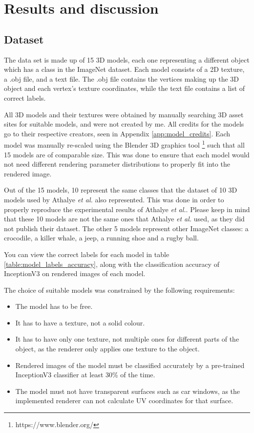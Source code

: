 \chapter{Results and discussion}
    \label{chap:results}

\section{Dataset}
    \label{sec:dataset}
    
The data set is made up of 15 3D models, each one representing a different object which has a class in the ImageNet dataset. Each model consists of a 2D texture, a .obj file, and a text file. The .obj file contains the vertices making up the 3D object and each vertex's texture coordinates, while the text file contains a list of correct labels.

All 3D models and their textures were obtained by manually searching 3D asset sites for suitable models, and were not created by me. All credits for the models go to their respective creators, seen in Appendix \ref{app:model_credits}. Each model was manually re-scaled using the Blender 3D graphics tool \footnote{https://www.blender.org/} such that all 15 models are of comparable size. This was done to ensure that each model would not need different rendering parameter distributions to properly fit into the rendered image.

Out of the 15 models, 10 represent the same classes that the dataset of 10 3D models used by Athalye \textit{et al.} \cite{athalye} also represented. This was done in order to properly reproduce the experimental results of Athalye \textit{et al.}. Please keep in mind that these 10 models are not the same ones that Athalye \textit{et al.} used, as they did not publish their dataset. The other 5 models represent other ImageNet classes: a crocodile, a killer whale, a jeep, a running shoe and a rugby ball.

You can view the correct labels for each model in table \ref{table:model_labels_accuracy}, along with the classification accuracy of InceptionV3 on rendered images of each model.

The choice of suitable models was constrained by the following requirements:

\begin{itemize}
    \item The model has to be free.
    \item It has to have a texture, not a solid colour.
    \item It has to have only one texture, not multiple ones for different parts of the object, as the renderer only applies one texture to the object.
    \item Rendered images of the model must be classified accurately by a pre-trained InceptionV3 classifier at least 30\% of the time.
    \item The model must not have transparent surfaces such as car windows, as the implemented renderer can not calculate UV coordinates for that surface.
\end{itemize}

